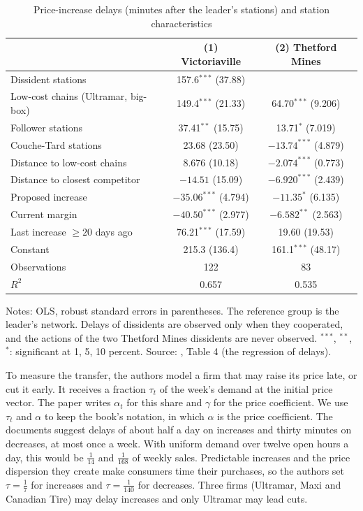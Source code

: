 \begin{table}[htbp]
\centering
\caption{Price-increase delays (minutes after the leader's stations) and station characteristics}\label{tab:13-ch-t4}
\small
\begin{tabular}{lcc}
\toprule
 & (1) Victoriaville & (2) Thetford Mines\\
\midrule
Dissident stations & 157.6$^{***}$ (37.88) & \\
Low-cost chains (Ultramar, big-box) & 149.4$^{***}$ (21.33) & 64.70$^{***}$ (9.206)\\
Follower stations & 37.41$^{**}$ (15.75) & 13.71$^{*}$ (7.019)\\
Couche-Tard stations & 23.68 (23.50) & $-13.74^{***}$ (4.879)\\
Distance to low-cost chains & 8.676 (10.18) & $-2.074^{***}$ (0.773)\\
Distance to closest competitor & $-14.51$ (15.09) & $-6.920^{***}$ (2.439)\\
Proposed increase & $-35.06^{***}$ (4.794) & $-11.35^{*}$ (6.135)\\
Current margin & $-40.50^{***}$ (2.977) & $-6.582^{**}$ (2.563)\\
Last increase $\ge20$ days ago & 76.21$^{***}$ (17.59) & 19.60 (19.53)\\
Constant & 215.3 (136.4) & 161.1$^{***}$ (48.17)\\
\addlinespace
Observations & 122 & 83\\
$R^2$ & 0.657 & 0.535\\
\bottomrule
\end{tabular}

\smallskip
\begin{minipage}{0.86\textwidth}\footnotesize
Notes: OLS, robust standard errors in parentheses. The reference group is the leader's network. Delays of dissidents are observed
only when they cooperated, and the actions of the two Thetford Mines dissidents are never observed. $^{***}$, $^{**}$, $^{*}$:
significant at 1, 5, 10 percent. Source: \citet{ClarkHoude2013}, Table 4 (the regression of delays).
\end{minipage}
\end{table}

To measure the transfer, the authors model a firm that may raise its price late, or cut it early. It receives a fraction
$\tau_t$ of the week's demand at the initial price vector. The paper writes $\alpha_t$ for this share and $\gamma$ for the price
coefficient. We use $\tau_t$ and $\alpha$ to keep the book's notation, in which $\alpha$ is the price coefficient. The documents suggest delays of about half a day on increases and thirty minutes on decreases, at most once a
week. With uniform demand over twelve open hours a day, this would be $\frac{1}{14}$ and $\frac{1}{168}$ of weekly sales.
Predictable increases and the price dispersion they create make consumers time their purchases, so the authors set
$\tau=\frac{1}{7}$ for increases and $\tau=\frac{1}{140}$ for decreases. Three firms (Ultramar, Maxi and Canadian Tire) may delay
increases and only Ultramar may lead cuts.


